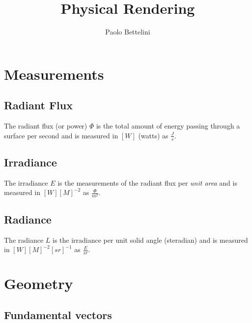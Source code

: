\documentclass[a4paper]{article}
\title{Physical Rendering}
\author{Paolo Bettelini}
\date{}
\begin{document}
\maketitle
\tableofcontents
\pagebreak

\section{Measurements}

\subsection{Radiant Flux}

The radiant flux (or power) \(\Phi\) is the total amount of energy passing
through a surface per second and is measured in \([W]\) (watts) as \(\frac{J}{s}\).

\subsection{Irradiance}

The irradiance \(E\) is the measurements of the radiant flux per \textit{unit area}
and is measured in \([W]{[M]}^{-2}\) as \(\frac{\Phi}{m^2}\).

\subsection{Radiance}

The radiance \(L\) is the irradiance per unit solid angle (steradian) and is
measured in \([W]{[M]}^{-2}{[sr]}^{-1}\) as \(\frac{E}{sr}\).

\section{Geometry}

\subsection{Fundamental vectors}

\begin{center}
\end{center}
\end{document}
